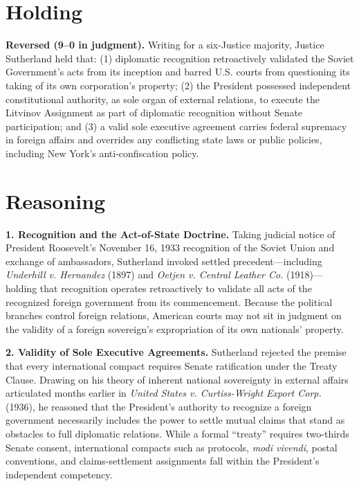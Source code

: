 \documentclass[12pt]{article}
\begin{document}
\section{Holding}

\textbf{Reversed (9--0 in judgment).} Writing for a six-Justice majority, Justice Sutherland held that: (1) diplomatic recognition retroactively validated the Soviet Government's acts from its inception and barred U.S. courts from questioning its taking of its own corporation's property; (2) the President possessed independent constitutional authority, as sole organ of external relations, to execute the Litvinov Assignment as part of diplomatic recognition without Senate participation; and (3) a valid sole executive agreement carries federal supremacy in foreign affairs and overrides any conflicting state laws or public policies, including New York's anti-confiscation policy.

\section{Reasoning}

\textbf{1. Recognition and the Act-of-State Doctrine.} Taking judicial notice of President Roosevelt's November 16, 1933 recognition of the Soviet Union and exchange of ambassadors, Sutherland invoked settled precedent---including \textit{Underhill v. Hernandez} (1897) and \textit{Oetjen v. Central Leather Co.} (1918)---holding that recognition operates retroactively to validate all acts of the recognized foreign government from its commencement. Because the political branches control foreign relations, American courts may not sit in judgment on the validity of a foreign sovereign's expropriation of its own nationals' property.

\textbf{2. Validity of Sole Executive Agreements.} Sutherland rejected the premise that every international compact requires Senate ratification under the Treaty Clause. Drawing on his theory of inherent national sovereignty in external affairs articulated months earlier in \textit{United States v. Curtiss-Wright Export Corp.} (1936), he reasoned that the President's authority to recognize a foreign government necessarily includes the power to settle mutual claims that stand as obstacles to full diplomatic relations. While a formal ``treaty'' requires two-thirds Senate consent, international compacts such as protocols, \textit{modi vivendi}, postal conventions, and claims-settlement assignments fall within the President's independent competency.
\end{document}
